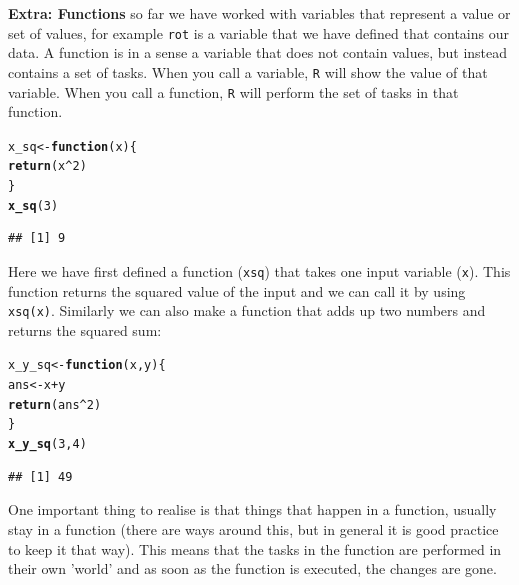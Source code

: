 \documentclass{article}\usepackage[]{graphicx}\usepackage[]{color}
\makeatletter
\newcommand{\hlnum}[1]{\textcolor[rgb]{0.686,0.059,0.569}{#1}}%
\newcommand{\hlopt}[1]{\textcolor[rgb]{0,0,0}{#1}}%
\newcommand{\hlstd}[1]{\textcolor[rgb]{0.345,0.345,0.345}{#1}}%
\newcommand{\hlkwa}[1]{\textcolor[rgb]{0.161,0.373,0.58}{\textbf{#1}}}%
\newcommand{\hlkwb}[1]{\textcolor[rgb]{0.69,0.353,0.396}{#1}}%
\newcommand{\hlkwc}[1]{\textcolor[rgb]{0.333,0.667,0.333}{#1}}%
\newcommand{\hlkwd}[1]{\textcolor[rgb]{0.737,0.353,0.396}{\textbf{#1}}}%
\newenvironment{kframe}{%
 \def\at@end@of@kframe{}%
 \ifinner\ifhmode%
  \def\at@end@of@kframe{\end{minipage}}%
  \begin{minipage}{\columnwidth}%
 \fi\fi%
 \def\FrameCommand##1{\hskip\@totalleftmargin \hskip-\fboxsep
 \colorbox{shadecolor}{##1}\hskip-\fboxsep
     \hskip-\linewidth \hskip-\@totalleftmargin \hskip\columnwidth}%
 \MakeFramed {\advance\hsize-\width
   \@totalleftmargin\z@ \linewidth\hsize
   \@setminipage}}%
 {\par\unskip\endMakeFramed%
 \at@end@of@kframe}
\newenvironment{knitrout}{}{} %
\makeatother
\begin{document}
\begin{mdframed}
\textbf{Extra: Functions} so far we have worked with variables that represent a value or set of values, for example \texttt{rot} is a variable that we have defined that contains our data. A function is in a sense a variable that does not contain values, but instead contains a set of tasks. When you call a variable, \texttt{R} will show the value of that variable. When you call a function, \texttt{R} will perform the set of tasks in that function.
\begin{knitrout}
\color{fgcolor}\begin{kframe}
\begin{alltt}
\hlstd{x_sq} \hlkwb{<-} \hlkwa{function}\hlstd{(}\hlkwc{x}\hlstd{)\{}
  \hlkwd{return}\hlstd{(x}\hlopt{^}\hlnum{2}\hlstd{)}
\hlstd{\}}
\hlkwd{x_sq}\hlstd{(}\hlnum{3}\hlstd{)}
\end{alltt}
\begin{verbatim}
## [1] 9
\end{verbatim}
\end{kframe}
\end{knitrout}
Here we have first defined a function (\texttt{x\textunderscore sq}) that takes one input variable (\texttt{x}). This function returns the squared value of the input and we can call it by using \texttt{x\textunderscore sq(x)}. Similarly we can also make a function that adds up two numbers and returns the squared sum:
\begin{knitrout}
\color{fgcolor}\begin{kframe}
\begin{alltt}
\hlstd{x_y_sq} \hlkwb{<-} \hlkwa{function}\hlstd{(}\hlkwc{x}\hlstd{,}\hlkwc{y}\hlstd{)\{}
  \hlstd{ans} \hlkwb{<-} \hlstd{x} \hlopt{+} \hlstd{y}
  \hlkwd{return}\hlstd{(ans}\hlopt{^}\hlnum{2}\hlstd{)}
\hlstd{\}}
\hlkwd{x_y_sq}\hlstd{(}\hlnum{3}\hlstd{,} \hlnum{4}\hlstd{)}
\end{alltt}
\begin{verbatim}
## [1] 49
\end{verbatim}
\end{kframe}
\end{knitrout}
One important thing to realise is that things that happen in a function, usually stay in a function (there are ways around this, but in general it is good practice to keep it that way). This means that the tasks in the function are performed in their own 'world' and as soon as the function is executed, the changes are gone.

\end{mdframed}
\end{document}
